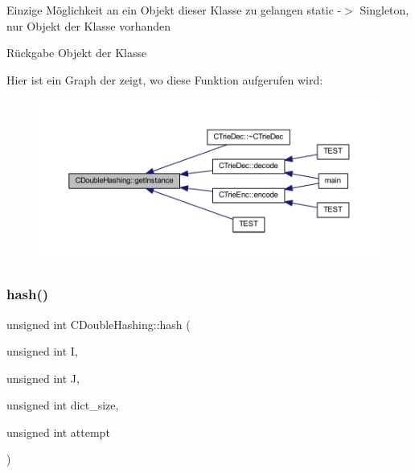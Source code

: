 Einzige Möglichkeit an ein Objekt dieser Klasse zu gelangen static -\/$>$ Singleton, nur Objekt der Klasse vorhanden \begin{DoxyReturn}{Rückgabe}
Objekt der Klasse 
\end{DoxyReturn}
Hier ist ein Graph der zeigt, wo diese Funktion aufgerufen wird\+:
\nopagebreak
\begin{figure}[H]
\begin{center}
\leavevmode
\includegraphics[width=350pt]{class_c_double_hashing_a3917e940f9bac5c981156062eb2b1169_icgraph}
\end{center}
\end{figure}
\mbox{\label{class_c_double_hashing_a0ec6ff1eb94927284b8e6fe4f650ecf9}} 
\subsubsection{\texorpdfstring{hash()}{hash()}}
{\footnotesize\ttfamily unsigned int C\+Double\+Hashing\+::hash (\begin{DoxyParamCaption}\item[{unsigned int}]{I,  }\item[{unsigned int}]{J,  }\item[{unsigned int}]{dict\+\_\+size,  }\item[{unsigned int}]{attempt }\end{DoxyParamCaption})}

